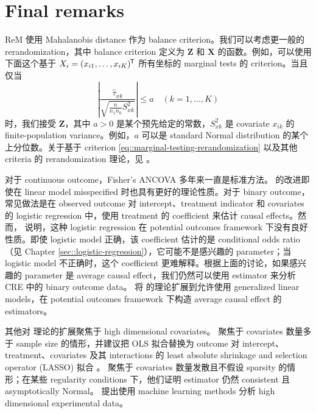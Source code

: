 \section{Final remarks}

ReM 使用 Mahalanobis distance 作为 balance criterion。我们可以考虑更一般的 rerandomization，其中 balance criterion 定义为 $\boldsymbol{Z}$ 和 $\boldsymbol{X}$ 的函数。例如，可以使用下面这个基于 $X_i = (x_{i1}, \ldots, x_{iK})^{\mkern-1.5mu\mathsf{T}}$ 所有坐标的 marginal tests 的 criterion。当且仅当
\begin{equation}
\label{eq::marginal-testing-rerandomization}
\left | \frac{  \hat{\tau}_{xk} }{   \sqrt{  \frac{n}{n_1 n_0} S_{xk}^2       }  }   \right | \leq  a \quad ( k=1,\ldots, K )
\end{equation}
时，我们接受 $\boldsymbol{Z}$，其中 $a > 0$ 是某个预先给定的常数，$S_{xk}^2$ 是 covariate $x_{ik}$ 的 finite-population variance。例如，$a$ 可以是 standard Normal distribution 的某个上分位数。关于基于 criterion \eqref{eq::marginal-testing-rerandomization} 以及其他 criteria 的 rerandomization 理论，见 \citet{zhao2021no}。

对于 continuous outcome，Fisher's ANCOVA 多年来一直是标准方法。\citet{lin2013} 的改进即使在 linear model misspecified 时也具有更好的理论性质。对于 binary outcome，常见做法是在 observed outcome 对 intercept、treatment indicator 和 covariates 的 logistic regression 中，使用 treatment 的 coefficient 来估计 causal effects。然而，\citet{freedman2008randomization} 说明，这种 logistic regression 在 potential outcomes framework 下没有良好性质。即使 logistic model 正确，该 coefficient 估计的是 conditional odds ratio（见 Chapter \ref{sec::logistic-regression}），它可能不是感兴趣的 parameter；当 logistic model 不正确时，这个 coefficient 更难解释。根据上面的讨论，如果感兴趣的 parameter 是 average causal effect，我们仍然可以使用 \citet{lin2013} estimator 来分析 CRE 中的 binary outcome data。\cite{guo2020generalized} 将 \citet{lin2013} 的理论扩展到允许使用 generalized linear models，在 potential outcomes framework 下构造 average causal effect 的 estimators。

其他对 \citet{lin2013} 理论的扩展聚焦于 high dimensional covariates。\citet{bloniarz2015lasso} 聚焦于 covariates 数量多于 sample size 的情形，并建议把 OLS 拟合替换为 outcome 对 intercept、treatment、covariates 及其 interactions 的 least absolute shrinkage and selection operator (LASSO) 拟合 \citep{tibshirani1996regression}。\citet{lei2018regression} 聚焦于 covariates 数量发散且不假设 sparsity 的情形；在某些 regularity conditions 下，他们证明 \citet{lin2013} estimator 仍然 consistent 且 asymptotically Normal。\citet{wager2016high} 提出使用 machine learning methods 分析 high dimensional experimental data。

